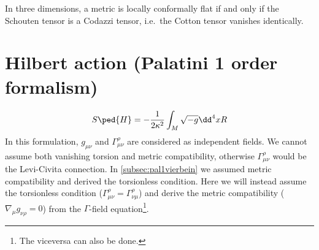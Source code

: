 \documentclass[a4paper,12pt]{book}
\begin{document}
\begin{theorem}
In three dimensions, a metric is locally conformally flat if and only if the Schouten tensor is a Codazzi tensor, i.e.~the Cotton tensor vanishes identically.
\end{theorem}

\section{Hilbert action (Palatini 1 order formalism)}
\[S\ped{H}=-\frac1{2\kappa^2}\int_M\sqrt{-g}\dd^4xR\]
In this formulation, $g_{\mu\nu}$ and $\Gamma^\rho_{\mu\nu}$ are considered as independent fields. We cannot assume both vanishing torsion and metric compatibility, otherwise $\Gamma^\rho_{\mu\nu}$ would be the Levi-Civita connection. In \cref{subsec:pal1vierbein} we assumed metric compatibility and derived the torsionless condition. Here we will instead assume the torsionless condition ($\Gamma^\rho_{\mu\nu}=\Gamma^\rho_{\nu\mu}$) and derive the metric compatibility ($\nabla_\mu g_{\nu\rho}=0$) from the $\Gamma$-field equation\footnote{The viceversa can also be done.}.
\end{document}
